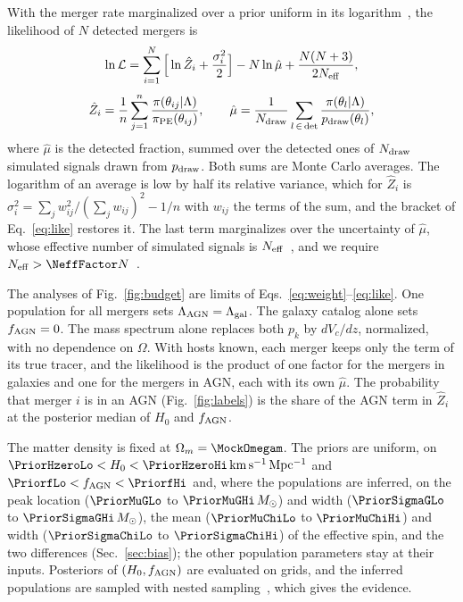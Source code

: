\documentclass[aps,prd,reprint,superscriptaddress,nofootinbib]{revtex4-2}
\newcommand{\kms}{\,{\rm km\,s^{-1}\,Mpc^{-1}}}
\newcommand{\Msun}{\,M_\odot}
\newcommand{\fagn}{f_{\rm AGN}}
\begin{document}
With the merger rate marginalized over a prior uniform in its
logarithm~\cite{Loredo:2004nn,Mandel:2018mve}, the likelihood of $N$ detected mergers is
\begin{equation}
\ln\mathcal{L}=\sum_{i=1}^{N}\Big[\ln\hat Z_i+\frac{\sigma_i^2}{2}\Big]-N\ln\hat\mu
+\frac{N(N+3)}{2N_{\rm eff}},
\label{eq:like}
\end{equation}
\begin{equation}
\hat Z_i=\frac1n\sum_{j=1}^{n}\frac{\pi(\theta_{ij}|\Lambda)}{\pi_{\rm PE}(\theta_{ij})},\qquad
\hat\mu=\frac{1}{N_{\rm draw}}\sum_{l\,\in\,{\rm det}}\frac{\pi(\theta_l|\Lambda)}{p_{\rm draw}(\theta_l)},
\label{eq:sums}
\end{equation}
where $\hat\mu$ is the detected fraction, summed over the detected ones of $N_{\rm draw}$
simulated signals drawn from $p_{\rm draw}$. Both sums are Monte Carlo averages. The logarithm
of an average is low by half its relative variance, which for $\hat Z_i$ is
$\sigma_i^2=\sum_j w_{ij}^2/(\sum_j w_{ij})^2-1/n$ with $w_{ij}$ the terms of the sum, and the
bracket of Eq.~\eqref{eq:like} restores it. The last term marginalizes over the uncertainty of
$\hat\mu$, whose effective number of simulated signals is
$N_{\rm eff}$~\cite{Farr:2019rap}, and we require
$N_{\rm eff}>\NeffFactor N$~\cite{Farr:2019rap,Essick:2022ojx,Talbot:2023pex}.

The analyses of Fig.~\ref{fig:budget} are limits of
Eqs.~\eqref{eq:weight}--\eqref{eq:like}. One population for all mergers sets
$\Lambda_{\rm AGN}=\Lambda_{\rm gal}$. The galaxy catalog alone sets $\fagn=0$. The mass
spectrum alone replaces both $p_k$ by $dV_c/dz$, normalized, with no dependence on $\Omega$.
With hosts known, each merger keeps only the term of its true tracer, and the likelihood is the
product of one factor for the mergers in galaxies and one for the mergers in AGN, each with its
own $\hat\mu$. The probability that merger $i$ is in an AGN (Fig.~\ref{fig:labels}) is the share
of the AGN term in $\hat Z_i$ at the posterior median of $H_0$ and $\fagn$.

The matter density is fixed at $\Omega_m=\MockOmegam$. The priors are uniform, on
$\PriorHzeroLo<H_0<\PriorHzeroHi\kms$ and $\PriorfLo<\fagn<\PriorfHi$ and, where the populations
are inferred, on the peak location ($\PriorMuGLo$ to $\PriorMuGHi\Msun$) and width
($\PriorSigmaGLo$ to $\PriorSigmaGHi\Msun$), the mean ($\PriorMuChiLo$ to $\PriorMuChiHi$) and
width ($\PriorSigmaChiLo$ to $\PriorSigmaChiHi$) of the effective spin, and the two differences
(Sec.~\ref{sec:bias}); the other population parameters stay at their inputs. Posteriors of
$(H_0,\fagn)$ are evaluated on grids, and the inferred populations are sampled with nested
sampling~\cite{Speagle:2019ivv}, which gives the evidence.
\end{document}
